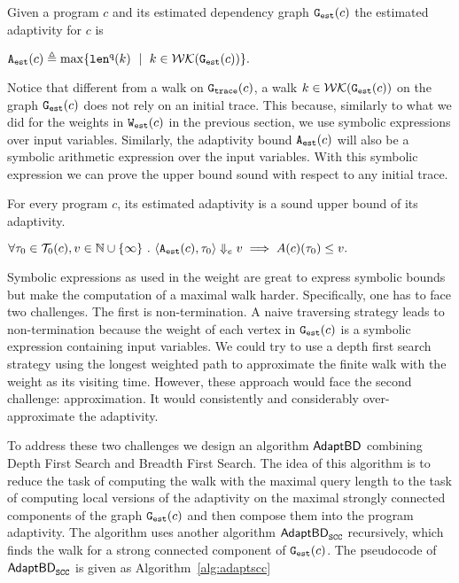 \begin{defn}
\label{def:prog_adapt}
{
Given a program ${c}$ and its estimated dependency graph 
$\mathtt{{G_{est}}}({c})$
the estimated adaptivity for $c$ is 
\begin{center}
$
\progA({c})
\triangleq \max
\left\{ \qlen(k) \ \mid \  k \in \walks(\progG(c))\right \}.
$
\end{center}
}
\end{defn}



Notice that different from a walk on $\mathtt{{G_{trace}}}(c)$, a walk $k \in \mathcal{WK}(\mathtt{{G_{est}}}(c))$ on the graph $\mathtt{{G_{est}}}(c)$  does not rely on an initial trace. This because, similarly to what we did for the weights in $\mathtt{{W_{est}}}(c)$ in the previous section, we use symbolic expressions over input variables. Similarly, the adaptivity bound ${\mathtt{A_{est}}}(c)$ will also be a symbolic arithmetic expression over the input variables. With this symbolic expression we can prove the upper bound sound with respect to any initial trace. 

%
\begin{thm}
    \label{thm:sound_progadapt}
    For every program $c$, 
    its estimated adaptivity is a sound upper bound of its adaptivity.
\begin{center}
$
     \forall \mathtt{\tau}_0 \in \mathcal{T}_{0}(c), v \in \mathbb{N}\cup \{\infty\} ~.~ 
\langle {\ensuremath{\mathtt{A_{est}}}}(c), \mathtt{\tau}_0 \rangle \Downarrow_e v \implies A(c)(\mathtt{\tau}_0) \leq v.
$
\end{center}
\end{thm}

Symbolic expressions as used in the weight  are great to express symbolic bounds but make the computation of 
a maximal walk harder. Specifically, one has to face two challenges. The first is non-termination.
A naive traversing strategy leads to non-termination
because the weight of each vertex in $\mathtt{{G_{est}}}({c})$
is a symbolic expression containing input variables.
We could try to use a depth first search strategy
using the longest weighted path to approximate
the finite walk with the weight as
its visiting time. However, these approach would face the second challenge: approximation.
It would consistently and considerably over-approximate the adaptivity.

To address these two challenges we design an algorithm $\mathsf{AdaptBD}$  combining 
Depth First Search and Breadth First Search.
The idea of this algorithm is to reduce the task of computing the
walk with the maximal query length to the task of computing local versions of the adaptivity on the maximal strongly connected components of the graph $\mathtt{{G_{est}}}(c)$ and then compose them into the program adaptivity. 
The algorithm  uses  
another algorithm $\mathsf{AdaptBD}_{\mathtt{SCC}}$  recursively, which finds the {walk} for a strong connected component of $\mathtt{{G_{est}}}(c)$. The pseudocode of $\mathsf{AdaptBD}_{\mathtt{SCC}}$ is given as Algorithm~\ref{alg:adaptscc}

